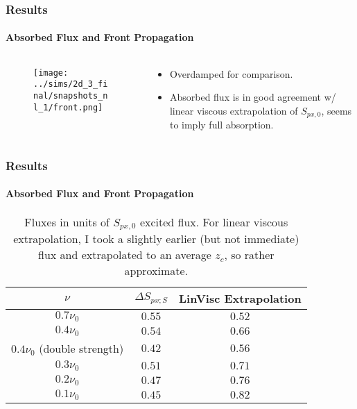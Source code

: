 \documentclass[dvipsnames]{beamer}
\begin{document}
\begin{frame}
    \frametitle{Results}
    \framesubtitle{Absorbed Flux and Front Propagation}

    \begin{columns}
        \begin{column}{0.5\textwidth}
            \begin{figure}[t]
                \centering
                \texttt{[image: ../sims/2d\_3\_final/snapshots\_nl\_1/front.png]}
            \end{figure}
        \end{column}
        \begin{column}{0.5\textwidth}
            \begin{itemize}
                \item Overdamped for comparison.

                \item Absorbed flux is in good agreement w/ linear viscous
                    extrapolation of $S_{px, 0}$, seems to imply full
                    absorption.
            \end{itemize}
        \end{column}
    \end{columns}
\end{frame}

\begin{frame}
    \frametitle{Results}
    \framesubtitle{Absorbed Flux and Front Propagation}

    \begin{table}[t]
        \centering
        \begin{tabular}{c c c}
            $\nu$ & $\Delta S_{px; S}$ & LinVisc Extrapolation\\\midrule
            $0.7\nu_0$ & $0.55$ & $0.52$\\
            $0.4\nu_0$ & $0.54$ & $0.66$\\
            $0.4\nu_0$ (double strength) & $0.42$ & $0.56$\\
            $0.3\nu_0$ & $0.51$ & $0.71$\\
            $0.2\nu_0$ & $0.47$ & $0.76$\\
            $0.1\nu_0$ & $0.45$ & $0.82$
        \end{tabular}
        \caption{Fluxes in units of $S_{px, 0}$ excited flux. For linear viscous
        extrapolation, I took a slightly earlier (but not immediate) flux and
        extrapolated to an average $z_c$, so rather approximate.}
    \end{table}
\end{frame}
\end{document}
